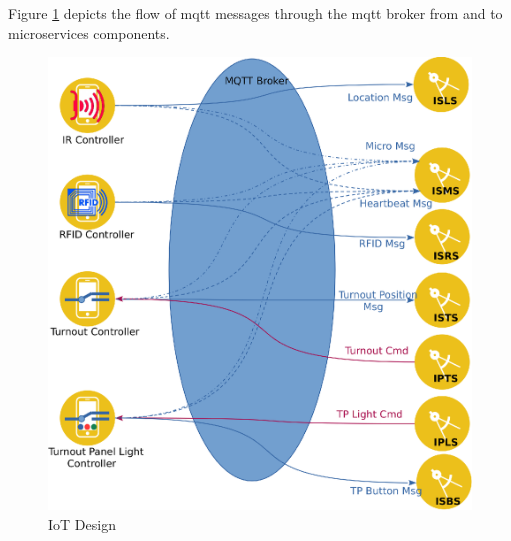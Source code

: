 Figure \ref{fig:iotdesign} depicts the flow of \gls{mqtt} messages through the \gls{mqtt} broker from and to microservices components.

\begin{figure}[H]
	\centering
		\includegraphics[scale=0.7]{mqtt-v7.eps}
	\caption{IoT Design}
	\label{fig:iotdesign}
\end{figure}

